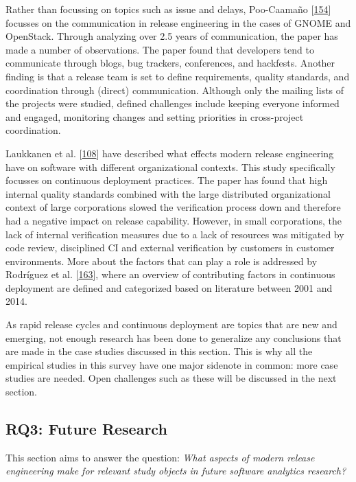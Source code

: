 \documentclass[]{book}
\begin{document}
Rather than focussing on topics such as issue and delays, Poo-Caamaño
{[}\protect\hyperlink{ref-poo-caamano2016a}{154}{]} focusses on the
communication in release engineering in the cases of GNOME and
OpenStack. Through analyzing over 2.5 years of communication, the paper
has made a number of observations. The paper found that developers tend
to communicate through blogs, bug trackers, conferences, and hackfests.
Another finding is that a release team is set to define requirements,
quality standards, and coordination through (direct) communication.
Although only the mailing lists of the projects were studied, defined
challenges include keeping everyone informed and engaged, monitoring
changes and setting priorities in cross-project coordination.

Laukkanen et al. {[}\protect\hyperlink{ref-laukkanen2018a}{108}{]} have
described what effects modern release engineering have on software with
different organizational contexts. This study specifically focusses on
continuous deployment practices. The paper has found that high internal
quality standards combined with the large distributed organizational
context of large corporations slowed the verification process down and
therefore had a negative impact on release capability. However, in small
corporations, the lack of internal verification measures due to a lack
of resources was mitigated by code review, disciplined CI and external
verification by customers in customer environments. More about the
factors that can play a role is addressed by Rodríguez et al.
{[}\protect\hyperlink{ref-rodriguez2017a}{163}{]}, where an overview of
contributing factors in continuous deployment are defined and
categorized based on literature between 2001 and 2014.

As rapid release cycles and continuous deployment are topics that are
new and emerging, not enough research has been done to generalize any
conclusions that are made in the case studies discussed in this section.
This is why all the empirical studies in this survey have one major
sidenote in common: more case studies are needed. Open challenges such
as these will be discussed in the next section.

\subsection{RQ3: Future Research}\label{rq3-future-research}

This section aims to answer the question: \emph{What aspects of modern
release engineering make for relevant study objects in future software
analytics research?}
\end{document}
